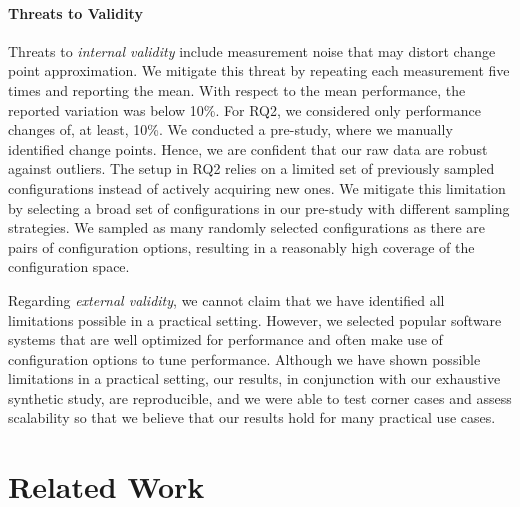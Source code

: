 \documentclass[sigconf]{acmart}
\begin{document}
	\paragraph{Threats to Validity}
	Threats to \emph{internal validity} include measurement noise that may distort change point approximation. We mitigate this threat by repeating each measurement five times and reporting the mean. With respect to the mean performance, the reported variation was below 10\%. For RQ2, we considered only performance changes of, at least, 10\%. We conducted a pre-study, where we manually identified change points.
	Hence, we are confident that our raw data are robust against outliers. The setup in RQ2 relies on a limited set of previously sampled configurations instead of actively acquiring new ones. We mitigate this limitation by selecting a broad set of configurations in our pre-study with different sampling strategies. We sampled as many randomly selected configurations as there are pairs of configuration options, resulting in a reasonably high coverage of the configuration space. 
	
	Regarding \emph{external validity}, we cannot claim that we have identified all limitations possible in a practical setting. However, we selected popular software systems that are well optimized for performance and often make use of configuration options to tune performance.  Although we have shown possible limitations in a practical setting, our results, in conjunction with our exhaustive synthetic study, are reproducible, and we were able to test corner cases and assess scalability so that we believe that our results hold for many practical use cases.
	
	\section{Related Work}\label{sec:rw}
\end{document}
